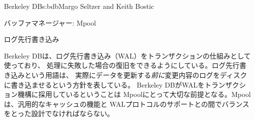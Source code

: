 \begin{aosachapter}{Berkeley DB}{s:bdb}{Margo Seltzer and Keith Bostic}
\begin{aosasect1}{バッファマネージャー: Mpool}
\begin{aosasect2}{ログ先行書き込み}

Berkeley DBは、ログ先行書き込み（WAL）をトランザクションの仕組みとして使っており、
処理に失敗した場合の復旧をできるようにしている。ログ先行書き込みという用語は、
実際にデータを更新する\emph{前に}変更内容のログをディスクに書き込ませるという方針を表している。
Berkeley DBがWALをトランザクション機構に採用しているということは
Mpoolにとって大切な前提となる。Mpoolは、汎用的なキャッシュの機能と
WALプロトコルのサポートとの間でバランスをとった設計でなければならない。


\end{aosasect2}
\end{aosasect1}
\end{aosachapter}
